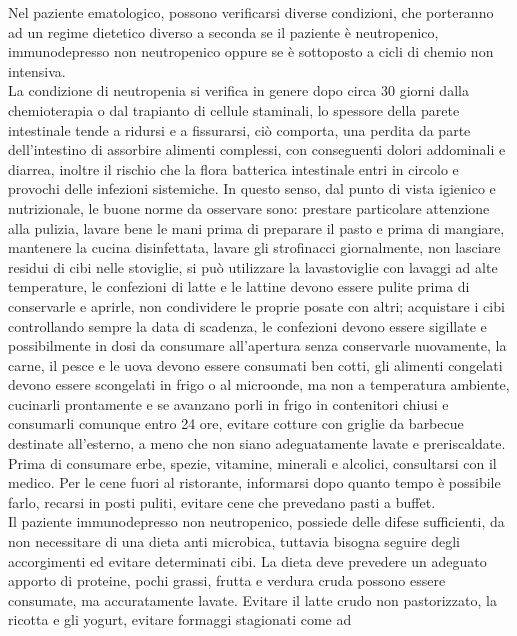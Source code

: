 Nel paziente ematologico, possono verificarsi diverse condizioni, che porteranno ad un regime dietetico diverso a 
seconda se il  paziente è neutropenico, immunodepresso non neutropenico oppure se è sottoposto a cicli di chemio 
non intensiva\cite{DIETA}.\\
La condizione di neutropenia si verifica in genere dopo circa 30 giorni dalla chemioterapia o dal trapianto di 
cellule staminali, lo spessore della parete intestinale tende a ridursi e a fissurarsi, ciò comporta, una perdita 
da parte dell’intestino di assorbire alimenti complessi, con conseguenti dolori addominali e diarrea, inoltre il 
rischio che la flora batterica intestinale entri in circolo e provochi delle infezioni sistemiche. In questo senso, 
dal punto di vista igienico e nutrizionale, le buone norme da osservare sono: prestare particolare attenzione alla 
pulizia, lavare bene le mani prima di preparare il pasto e prima di mangiare, mantenere la cucina disinfettata, 
lavare gli strofinacci giornalmente, non lasciare residui di cibi nelle stoviglie, si può utilizzare la lavastoviglie 
con lavaggi ad alte temperature, le confezioni di latte e le lattine devono essere pulite prima di conservarle e 
aprirle, non condividere le proprie posate con altri; acquistare i cibi controllando sempre la data di scadenza, 
le confezioni devono essere sigillate e possibilmente in dosi da consumare all’apertura senza conservarle nuovamente, 
la carne, il pesce e le uova devono essere consumati ben cotti, gli alimenti congelati devono essere scongelati in 
frigo o al microonde, ma non a temperatura ambiente, cucinarli prontamente e se avanzano porli in frigo in contenitori 
chiusi e consumarli comunque entro 24 ore, evitare cotture con griglie da barbecue destinate all’esterno, a meno che 
non siano adeguatamente lavate e preriscaldate. Prima di consumare erbe, spezie, vitamine, minerali e alcolici, 
consultarsi con il medico. Per le cene fuori al ristorante, informarsi dopo quanto tempo è possibile farlo, 
recarsi in posti puliti, evitare cene che prevedano pasti a buffet\cite{DIETA}.\\
Il paziente immunodepresso non neutropenico, possiede delle difese sufficienti, da non necessitare di una dieta 
anti microbica, tuttavia bisogna seguire degli accorgimenti ed evitare determinati cibi. La dieta deve prevedere 
un adeguato apporto di proteine, pochi grassi, frutta e verdura cruda possono essere consumate, ma accuratamente 
lavate. Evitare il latte crudo non pastorizzato, la ricotta e gli yogurt, evitare formaggi stagionati come ad 
